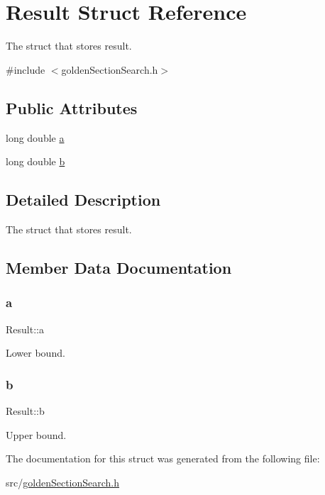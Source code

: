 \hypertarget{struct_result}{}\section{Result Struct Reference}
\label{struct_result}


The struct that stores result.  




{\ttfamily \#include $<$golden\+Section\+Search.\+h$>$}

\subsection*{Public Attributes}
\begin{DoxyCompactItemize}
\item 
long double \mbox{\hyperlink{struct_result_ae71a2de0e642ecd81d695d3171d1c577}{a}}
\item 
long double \mbox{\hyperlink{struct_result_ac790d92ce6d4b45e26415bcd904ff966}{b}}
\end{DoxyCompactItemize}


\subsection{Detailed Description}
The struct that stores result. 

\subsection{Member Data Documentation}
\mbox{\label{struct_result_ae71a2de0e642ecd81d695d3171d1c577}} 
\subsubsection{\texorpdfstring{a}{a}}
{\footnotesize\ttfamily Result\+::a}

Lower bound. \mbox{\label{struct_result_ac790d92ce6d4b45e26415bcd904ff966}} 
\subsubsection{\texorpdfstring{b}{b}}
{\footnotesize\ttfamily Result\+::b}

Upper bound. 

The documentation for this struct was generated from the following file\+:\begin{DoxyCompactItemize}
\item 
src/\mbox{\hyperlink{golden_section_search_8h}{golden\+Section\+Search.\+h}}\end{DoxyCompactItemize}
